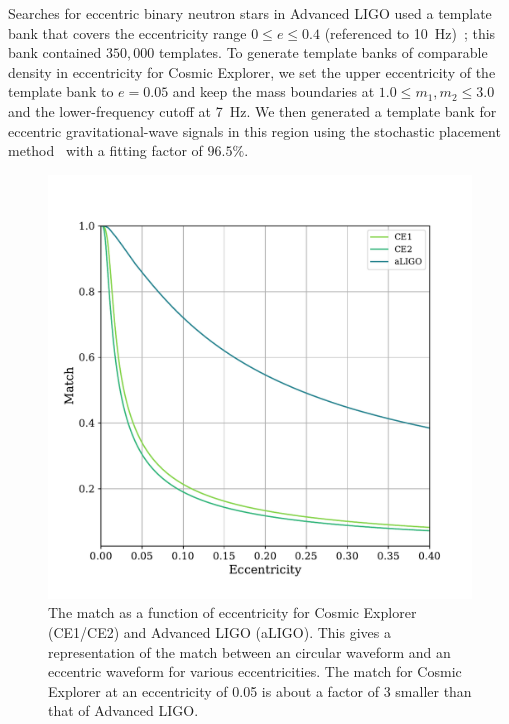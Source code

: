 Searches for eccentric binary neutron stars in Advanced LIGO used a template bank that covers the eccentricity range $0 \le e \le 0.4$ (referenced to 10~Hz)~\cite{Nitz:2019spj}; this bank contained $350,000$ templates. To generate template banks of comparable density in eccentricity for Cosmic Explorer, we set the upper eccentricity of the template bank to $e=0.05$ and keep the mass boundaries at $1.0 \leq m_1,m_2 \leq 3.0$ and the lower-frequency cutoff at 7~Hz. We then generated a template bank for eccentric gravitational-wave signals in this region using the stochastic placement method~\cite{Harry:2009ea,Manca:2009xw} with a fitting factor of $96.5\%$. 
\begin{figure}
    \includegraphics[width=1.1\columnwidth]{Figures/3G-bns-search-prospects/eccen-limit.pdf}
    \caption{The match as a function of eccentricity for Cosmic Explorer (CE1/CE2) and Advanced LIGO (aLIGO). This gives a representation of the match between an circular waveform and an eccentric waveform for various eccentricities. The match for Cosmic Explorer at an eccentricity of 0.05 is about a factor of 3 smaller than that of Advanced LIGO.}
\label{Fig:eccen-lim}
\end{figure}

